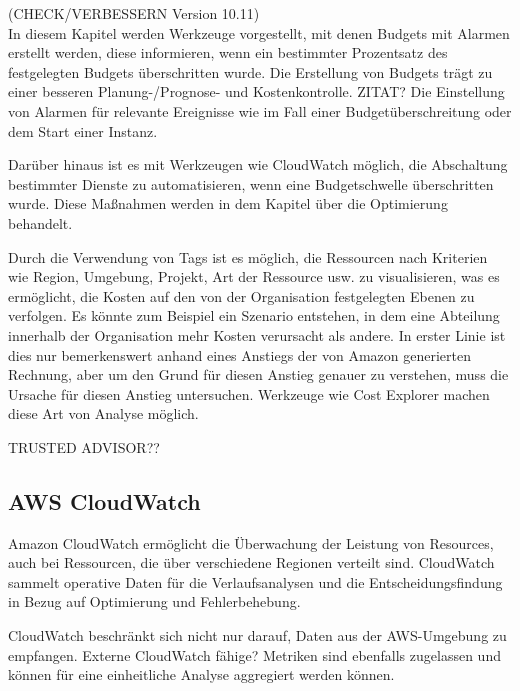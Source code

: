 (CHECK/VERBESSERN Version 10.11)\\
In diesem Kapitel werden Werkzeuge vorgestellt, mit denen Budgets mit Alarmen erstellt werden, diese informieren, wenn ein bestimmter Prozentsatz des festgelegten Budgets überschritten wurde. Die Erstellung von Budgets trägt zu einer besseren Planung-/Prognose- und Kostenkontrolle. ZITAT?
Die Einstellung von Alarmen für relevante Ereignisse wie im Fall einer Budgetüberschreitung oder dem Start einer Instanz.

Darüber hinaus ist es mit Werkzeugen wie CloudWatch möglich, die Abschaltung bestimmter Dienste zu automatisieren, wenn eine Budgetschwelle überschritten wurde. Diese Maßnahmen werden in dem Kapitel über die Optimierung behandelt.

Durch die Verwendung von Tags ist es möglich, die Ressourcen nach Kriterien wie Region, Umgebung, Projekt, Art der Ressource usw. zu visualisieren, was es ermöglicht, die Kosten auf den von der Organisation festgelegten Ebenen zu verfolgen. Es könnte zum Beispiel ein Szenario entstehen, in dem eine Abteilung innerhalb der Organisation mehr Kosten verursacht als andere. In erster Linie ist dies nur bemerkenswert anhand eines Anstiegs der von Amazon generierten Rechnung, aber um den Grund für diesen Anstieg genauer zu verstehen, muss die Ursache für diesen Anstieg untersuchen. Werkzeuge wie Cost Explorer machen diese Art von Analyse möglich.

TRUSTED ADVISOR??

\subsection{AWS CloudWatch}

Amazon CloudWatch ermöglicht die Überwachung der Leistung von Resources, auch bei Ressourcen, die über verschiedene Regionen verteilt sind.
CloudWatch sammelt operative Daten für die Verlaufsanalysen und die Entscheidungsfindung in Bezug auf Optimierung und Fehlerbehebung.

CloudWatch beschränkt sich nicht nur darauf, Daten aus der AWS-Umgebung zu empfangen.  Externe CloudWatch fähige? Metriken sind ebenfalls zugelassen und können für eine einheitliche Analyse aggregiert werden können.

